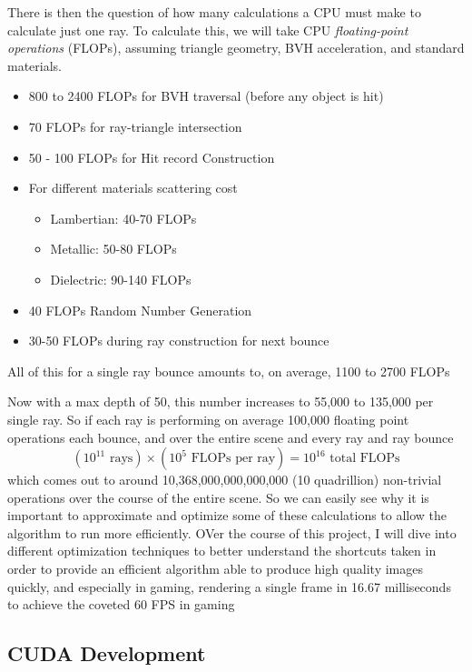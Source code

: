 \documentclass[11pt]{article}
\begin{document}
There is then the question of how many calculations a CPU must make to calculate just one ray. To calculate this, we will take CPU \textit{floating-point operations} (FLOPs), assuming triangle geometry, BVH acceleration, and standard materials.

\begin{itemize}
    \item 800 to 2400 FLOPs for BVH traversal (before any object is hit)
    \item 70 FLOPs for ray-triangle intersection
    \item 50 - 100 FLOPs for Hit record Construction
    \item For different materials scattering cost
    \begin{itemize}
        \item Lambertian: 40-70 FLOPs
        \item Metallic: 50-80 FLOPs
        \item Dielectric: 90-140 FLOPs
    \end{itemize}
    \item 40 FLOPs Random Number Generation 
    \item 30-50 FLOPs during ray construction for next bounce
\end{itemize}

All of this for a single ray bounce amounts to, on average, 1100 to 2700 FLOPs

Now with a max depth of 50, this number increases to 55,000 to 135,000 per single ray. So if each ray is performing on average 100,000 floating point operations each bounce, and over the entire scene and every ray and ray bounce \[(10^{11} \text{ rays}) \times (10^{5} \text{ FLOPs per ray}) = 10^{16} \text{ total FLOPs} \] which comes out to around 10,368,000,000,000,000 (10 quadrillion) non-trivial operations over the course of the entire scene. So we can easily see why it is important to approximate and optimize some of these calculations to allow the algorithm to run more efficiently. OVer the course of this project, I will dive into different optimization techniques to better understand the shortcuts taken in order to provide an efficient algorithm able to produce high quality images quickly, and especially in gaming, rendering a single frame in 16.67 milliseconds to achieve the coveted 60 FPS in gaming

\subsection{CUDA Development}
\end{document}
